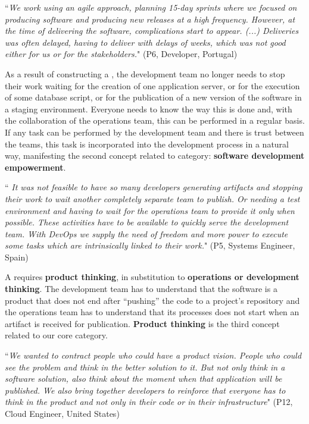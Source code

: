 \begin{mq}
``\emph{We work using an agile approach, planning 15-day sprints where we focused on
producing software and producing new releases at a high frequency. However, at the time of
delivering the software, complications start to appear. (...) Deliveries was often delayed,
having to deliver with delays of weeks, which was not good either for us or for
the stakeholders.}" (P6, Developer, Portugal)
\end{mq}

As a result of constructing a \cc, the development
team no longer needs to stop their work waiting for the creation
of one application server, or for the execution of some database script, or for
the publication of a new version of the software in a staging environment.
Everyone needs to know the way this is done and, with the collaboration of the
operations team, this can be performed in a regular basis. If any task can be
performed by the development team and there is trust between the teams, this task is
incorporated into the development process in a natural way, manifesting the
second concept related to \cc category: \textbf{software
development empowerment}.

\begin{mq}
``\emph{
It was not feasible to have so many developers generating artifacts and
stopping their work to wait another completely separate team to publish. Or
needing a test environment and having to wait for the operations team to
provide it only when possible. These activities have to be available to quickly
serve the development team. With DevOps we supply the need of freedom and
more power to execute some tasks which are intrinsically linked to their work.}"
(P5, Systems Engineer, Spain)
\end{mq}

A \cc requires  \textbf{product thinking}, in substitution to
\textbf{operations or development thinking}. The development team has to understand that
the software is a product that does not end after ``pushing'' the code to a
project's repository and the operations team has to understand that its processes does not
start when an artifact is received for publication. \textbf{Product thinking}
is the third concept related to our core category.

\begin{mq}
``\emph{We wanted to
contract people who could have a product vision. People who could see the
problem and think in the better solution to it. But not only think in a
software solution, also think about the moment when that application will be
published. We also bring together developers to reinforce that everyone
has to think in the product and not only in
their code or in their infrastructure}" (P12, Cloud Engineer, United States)
\end{mq}

